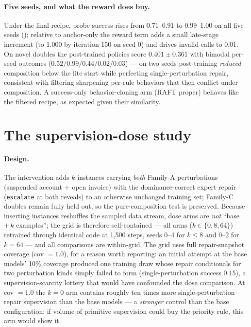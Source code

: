 \documentclass{article}
\begin{document}
\paragraph{Five seeds, and what the reward does buy.} Under the final recipe, probe success rises
from $0.71$--$0.91$ to $0.99$--$1.00$ on all five seeds (); relative to anchor-only the
reward term adds a small late-stage increment (to $1.000$ by iteration 150 on seed 0) and drives
invalid calls to $0.01$. On novel doubles the post-trained policies score $0.401\pm0.361$ with
bimodal per-seed outcomes ($0.52/0.99/0.44/0.02/0.03$) --- on two seeds post-training \emph{reduced}
composition below the lite start while perfecting single-perturbation repair, consistent with
filtering sharpening per-rule behaviors that then conflict under composition. A success-only
behavior-cloning arm (RAFT proper) behaves like the filtered recipe, as expected given their
similarity.

\section{The supervision-dose study}\label{app:dose}

\paragraph{Design.} The intervention adds $k$ instances carrying \emph{both} Family-A
perturbations (suspended account $+$ open invoice) with the dominance-correct expert repair
(\texttt{escalate} at both reveals) to an otherwise unchanged training set; Family-C doubles remain
fully held out, so the pure-composition test is preserved. Because inserting instances reshuffles
the sampled data stream, dose arms are \emph{not} ``base $+\,k$ examples''; the grid is therefore
self-contained --- all arms ($k \in \{0, 8, 64\}$) retrained through identical code at 1{,}500
steps, seeds 0--4 for $k \le 8$ and 0--2 for $k{=}64$ --- and all comparisons are within-grid. The
grid uses full repair-snapshot coverage (cov $=1.0$), for a reason worth reporting: an initial
attempt at the base models' 10\% coverage produced one training draw whose repair conditionals for
two perturbation kinds simply failed to form (single-perturbation success $0.15$), a
supervision-scarcity lottery that would have confounded the dose comparison. At cov $=1.0$ the
$k{=}0$ arm contains roughly ten times more single-perturbation repair supervision than the base
models --- a \emph{stronger} control than the base configuration: if volume of primitive
supervision could buy the priority rule, this arm would show it.
\end{document}
